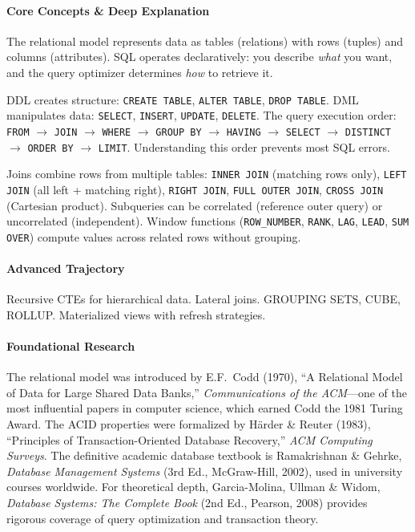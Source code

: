 \documentclass[11pt, a4paper, oneside]{report}
\newcommand{\arrow}{$\rightarrow$}
\begin{document}
\paragraph{Core Concepts \& Deep Explanation} The relational model represents data as tables (relations) with rows (tuples) and columns (attributes). SQL operates declaratively: you describe \emph{what} you want, and the query optimizer determines \emph{how} to retrieve it.

DDL creates structure: \texttt{CREATE TABLE}, \texttt{ALTER TABLE}, \texttt{DROP TABLE}. DML manipulates data: \texttt{SELECT}, \texttt{INSERT}, \texttt{UPDATE}, \texttt{DELETE}. The query execution order: \texttt{FROM} \arrow{} \texttt{JOIN} \arrow{} \texttt{WHERE} \arrow{} \texttt{GROUP BY} \arrow{} \texttt{HAVING} \arrow{} \texttt{SELECT} \arrow{} \texttt{DISTINCT} \arrow{} \texttt{ORDER BY} \arrow{} \texttt{LIMIT}. Understanding this order prevents most SQL errors.

Joins combine rows from multiple tables: \texttt{INNER JOIN} (matching rows only), \texttt{LEFT JOIN} (all left + matching right), \texttt{RIGHT JOIN}, \texttt{FULL OUTER JOIN}, \texttt{CROSS JOIN} (Cartesian product). Subqueries can be correlated (reference outer query) or uncorrelated (independent). Window functions (\texttt{ROW\_NUMBER}, \texttt{RANK}, \texttt{LAG}, \texttt{LEAD}, \texttt{SUM OVER}) compute values across related rows without grouping.

\paragraph{Advanced Trajectory} Recursive CTEs for hierarchical data. Lateral joins. GROUPING SETS, CUBE, ROLLUP. Materialized views with refresh strategies.


\paragraph{Foundational Research} The relational model was introduced by E.F.\ Codd (1970), ``A Relational Model of Data for Large Shared Data Banks,'' \emph{Communications of the ACM}---one of the most influential papers in computer science, which earned Codd the 1981 Turing Award. The ACID properties were formalized by H\"arder \& Reuter (1983), ``Principles of Transaction-Oriented Database Recovery,'' \emph{ACM Computing Surveys}. The definitive academic database textbook is Ramakrishnan \& Gehrke, \emph{Database Management Systems} (3rd Ed., McGraw-Hill, 2002), used in university courses worldwide. For theoretical depth, Garcia-Molina, Ullman \& Widom, \emph{Database Systems: The Complete Book} (2nd Ed., Pearson, 2008) provides rigorous coverage of query optimization and transaction theory.
\end{document}
